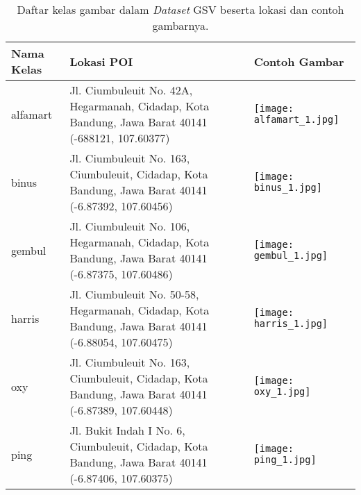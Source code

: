 \begin{longtable}{|p{}|p{}|p{}|}
	\caption{Daftar kelas gambar dalam \textit{Dataset} GSV beserta lokasi dan contoh gambarnya.}
	\label{tab:contoh_dataset_gsv} \\
	\hline
	\textbf{Nama Kelas} & \textbf{Lokasi POI} & \textbf{Contoh Gambar} \\
	\hline
	alfamart & Jl. Ciumbuleuit No. 42A, Hegarmanah, Cidadap, Kota Bandung, Jawa Barat 40141 (-688121, 107.60377) & \begin{minipage}{.4\textwidth}
		\vspace{5pt} \texttt{[image: alfamart\_1.jpg]}
	\end{minipage} \\
	\hline
	binus & Jl. Ciumbuleuit No. 163, Ciumbuleuit, Cidadap, Kota Bandung, Jawa Barat 40141 (-6.87392, 107.60456) & \begin{minipage}{.4\textwidth}
		\vspace{5pt} \texttt{[image: binus\_1.jpg]}
	\end{minipage} \\
	\hline
	gembul & Jl. Ciumbuleuit No. 106, Hegarmanah, Cidadap, Kota Bandung, Jawa Barat 40141 (-6.87375, 107.60486) & \begin{minipage}{.4\textwidth}
		\vspace{5pt} \texttt{[image: gembul\_1.jpg]}
	\end{minipage} \\
	\hline
	harris & Jl. Ciumbuleuit No. 50-58, Hegarmanah, Cidadap, Kota Bandung, Jawa Barat 40141 (-6.88054, 107.60475) & \begin{minipage}{.4\textwidth}
		\vspace{5pt} \texttt{[image: harris\_1.jpg]}
	\end{minipage} \\
	\hline
	oxy & Jl. Ciumbuleuit No. 163, Ciumbuleuit, Cidadap, Kota Bandung, Jawa Barat 40141 (-6.87389, 107.60448) & \begin{minipage}{.4\textwidth}
		\vspace{5pt} \texttt{[image: oxy\_1.jpg]}
	\end{minipage} \\
	\hline
	ping & Jl. Bukit Indah I No. 6, Ciumbuleuit, Cidadap, Kota Bandung, Jawa Barat 40141 (-6.87406, 107.60375) & \begin{minipage}{.4\textwidth}
		\vspace{5pt} \texttt{[image: ping\_1.jpg]}

\end{minipage}
\end{longtable}
